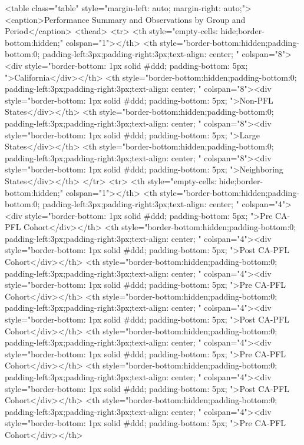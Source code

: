 <table class="table" style="margin-left: auto; margin-right: auto;">
<caption>Performance Summary and Observations by Group and Period</caption>
 <thead>
<tr>
<th style="empty-cells: hide;border-bottom:hidden;" colspan="1"></th>
<th style="border-bottom:hidden;padding-bottom:0; padding-left:3px;padding-right:3px;text-align: center; " colspan="8"><div style="border-bottom: 1px solid #ddd; padding-bottom: 5px; ">California</div></th>
<th style="border-bottom:hidden;padding-bottom:0; padding-left:3px;padding-right:3px;text-align: center; " colspan="8"><div style="border-bottom: 1px solid #ddd; padding-bottom: 5px; ">Non-PFL States</div></th>
<th style="border-bottom:hidden;padding-bottom:0; padding-left:3px;padding-right:3px;text-align: center; " colspan="8"><div style="border-bottom: 1px solid #ddd; padding-bottom: 5px; ">Large States</div></th>
<th style="border-bottom:hidden;padding-bottom:0; padding-left:3px;padding-right:3px;text-align: center; " colspan="8"><div style="border-bottom: 1px solid #ddd; padding-bottom: 5px; ">Neighboring States</div></th>
</tr>
<tr>
<th style="empty-cells: hide;border-bottom:hidden;" colspan="1"></th>
<th style="border-bottom:hidden;padding-bottom:0; padding-left:3px;padding-right:3px;text-align: center; " colspan="4"><div style="border-bottom: 1px solid #ddd; padding-bottom: 5px; ">Pre CA-PFL Cohort</div></th>
<th style="border-bottom:hidden;padding-bottom:0; padding-left:3px;padding-right:3px;text-align: center; " colspan="4"><div style="border-bottom: 1px solid #ddd; padding-bottom: 5px; ">Post CA-PFL Cohort</div></th>
<th style="border-bottom:hidden;padding-bottom:0; padding-left:3px;padding-right:3px;text-align: center; " colspan="4"><div style="border-bottom: 1px solid #ddd; padding-bottom: 5px; ">Pre CA-PFL Cohort</div></th>
<th style="border-bottom:hidden;padding-bottom:0; padding-left:3px;padding-right:3px;text-align: center; " colspan="4"><div style="border-bottom: 1px solid #ddd; padding-bottom: 5px; ">Post CA-PFL Cohort</div></th>
<th style="border-bottom:hidden;padding-bottom:0; padding-left:3px;padding-right:3px;text-align: center; " colspan="4"><div style="border-bottom: 1px solid #ddd; padding-bottom: 5px; ">Pre CA-PFL Cohort</div></th>
<th style="border-bottom:hidden;padding-bottom:0; padding-left:3px;padding-right:3px;text-align: center; " colspan="4"><div style="border-bottom: 1px solid #ddd; padding-bottom: 5px; ">Post CA-PFL Cohort</div></th>
<th style="border-bottom:hidden;padding-bottom:0; padding-left:3px;padding-right:3px;text-align: center; " colspan="4"><div style="border-bottom: 1px solid #ddd; padding-bottom: 5px; ">Pre CA-PFL Cohort</div></th>
